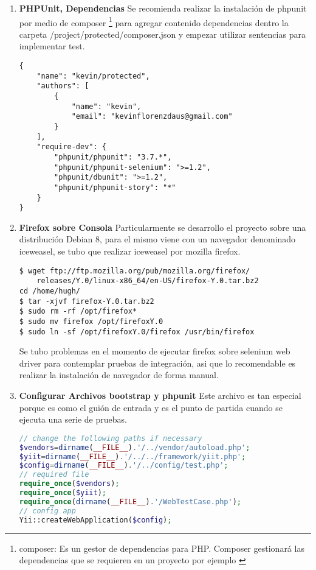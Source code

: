 \begin{enumerate}

\item \textbf{PHPUnit, Dependencias}
Se recomienda realizar la instalaci\'{o}n de phpunit por medio de composer 
\footnote{composer: Es un gestor de dependencias para PHP. Composer 
gestionar\'{a} las dependencias que se requieren en un proyecto por ejemplo 
\cite{composer}} para agregar contenido dependencias dentro la carpeta  
/project/protected/composer.json y empezar utilizar sentencias para implementar
test.

\begin{lstlisting}[]
{
    "name": "kevin/protected",
    "authors": [
        {
            "name": "kevin",
            "email": "kevinflorenzdaus@gmail.com"
        }
    ],
    "require-dev": {
        "phpunit/phpunit": "3.7.*",
        "phpunit/phpunit-selenium": ">=1.2",
        "phpunit/dbunit": ">=1.2",
        "phpunit/phpunit-story": "*"
    }
}
\end{lstlisting}

\item \textbf{Firefox sobre Consola}
Particularmente se desarrollo el proyecto sobre una distribuci\'{o}n Debian 8,
para el mismo viene con un navegador denominado iceweasel, se tubo que realizar
iceweasel por mozilla firefox.

\begin{lstlisting}[]
$ wget ftp://ftp.mozilla.org/pub/mozilla.org/firefox/
	releases/Y.0/linux-x86_64/en-US/firefox-Y.0.tar.bz2
cd /home/hugh/
$ tar -xjvf firefox-Y.0.tar.bz2
$ sudo rm -rf /opt/firefox*
$ sudo mv firefox /opt/firefoxY.0
$ sudo ln -sf /opt/firefoxY.0/firefox /usr/bin/firefox
\end{lstlisting}

Se tubo problemas en el momento de ejecutar firefox sobre selenium web driver
para contemplar pruebas de integraci\'{o}n, asi que lo recomendable es realizar
la instalaci\'{o}n de navegador de forma manual.

\item \textbf{Configurar Archivos bootstrap y phpunit}
Este archivo es tan especial porque es como el gui\'{o}n de entrada y es el punto
de partida cuando se ejecuta una serie de pruebas. \cite{testing}

\begin{lstlisting}[language=PHP]
// change the following paths if necessary
$vendors=dirname(__FILE__).'/../vendor/autoload.php';
$yiit=dirname(__FILE__).'/../../framework/yiit.php';
$config=dirname(__FILE__).'/../config/test.php';
// required file
require_once($vendors);
require_once($yiit);
require_once(dirname(__FILE__).'/WebTestCase.php');
// config app
Yii::createWebApplication($config);
\end{lstlisting}


\end{enumerate}

